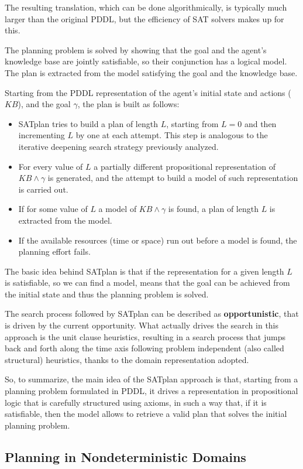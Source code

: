 \documentclass{article}
\begin{document}
The resulting translation, which can be done algorithmically, is typically much larger than the original PDDL, but the efficiency of SAT solvers makes up for this.

The planning problem is solved by showing that the goal and the agent's knowledge base are jointly satisfiable, so their conjunction has a logical model. The plan is extracted from the model satisfying the goal and the knowledge base.

Starting from the PDDL representation of the agent's initial state and actions ($KB$), and the goal $\gamma$, the plan is built as follows:
\begin{itemize}
    \item SATplan tries to build a plan of length $L$, starting from $L=0$ and then incrementing $L$ by one at each attempt. This step is analogous to the iterative deepening search strategy previously analyzed.
    \item For every value of $L$ a partially different propositional representation of $KB \land \gamma$ is generated, and the attempt to build a model of such representation is carried out.
    \item If for some value of $L$ a model of $KB \land \gamma$ is found, a plan of length $L$ is extracted from the model.
    \item If the available resources (time or space) run out before a model is found, the planning effort fails.
\end{itemize}
The basic idea behind SATplan is that if the representation for a given length $L$ is satisfiable, so we can find a model, means that the goal can be achieved from the initial state and thus the planning problem is solved.

The search process followed by SATplan can be described as \textbf{opportunistic}, that is driven by the current opportunity. What actually drives the search in this approach is the unit clause heuristics, resulting in a search process that jumps back and forth along the time axis following problem independent (also called structural) heuristics, thanks to the domain representation adopted. 

So, to summarize, the main idea of the SATplan approach is that, starting from a planning problem formulated in PDDL, it drives a representation in propositional logic that is carefully structured using axioms, in such a way that, if it is satisfiable, then the model allows to retrieve a valid plan that solves the initial planning problem.

\subsection{Planning in Nondeterministic Domains}
\end{document}
